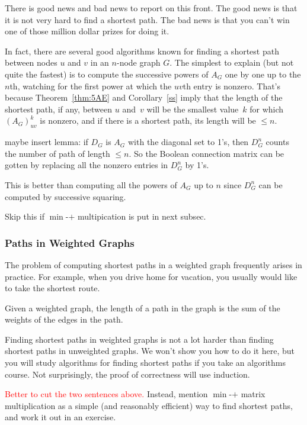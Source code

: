 There is good news and bad news to report on this front.  The good
news is that it is not very hard to find a shortest path.  The bad
news is that you can't win one of those million dollar prizes for
doing it.

In fact, there are several good algorithms known for finding a shortest
path between nodes $u$ and $v$ in an $n$-node graph $G$.  The simplest to
explain (but not quite the fastest) is to compute  the successive powers of $A_G$ one by one up to the
$n$th, watching for the first power at which the $uv$th entry is nonzero.
That's because Theorem~\ref{thm:5AE} and Corollary~\ref{ss} imply that the
length of the shortest path, if any, between $u$ and~$v$ will be the smallest
value~$k$ for which $(A_G)_{uv}^k$  is nonzero, and if there is a shortest
path, its length will be $\leq n$.

\begin{editingnotes}
maybe insert lemma: if $D_G$ is $A_G$ with the diagonal set to 1's, then $D_G^n$
counts the number of path of length $\leq n$.  So the Boolean connection
matrix can be gotten by replacing all the nonzero entries in $D_G^n$ by 1's.

This is better than computing all the powers of $A_G$ up to $n$ since
$D_G^n$ can be computed by successive squaring.

Skip this if $\min$-$+$ multipication is put in next subsec.
\end{editingnotes}

\subsubsection{Paths in Weighted Graphs}

The problem of computing shortest paths in a weighted graph frequently
arises in practice.  For example, when you drive home for vacation, you
usually would like to take the shortest route.

\begin{definition}\label{def:5H}
Given a weighted graph, the length of a path in the graph is the sum
of the weights of the edges in the path.
\end{definition}

Finding shortest paths in weighted graphs is not a lot harder than
finding shortest paths in unweighted graphs.
We won't show you how to do it here, but you will study algorithms for
finding shortest paths if you take an algorithms course.  Not
surprisingly, the proof of correctness will use induction.
\begin{editingnotes}
\textcolor{red}{Better to cut the two sentences above.}  Instead,
 mention $\min$-$+$ matrix multiplication as a
  simple (and reasonably efficient) way to find shortest paths, and work it
  out in an exercise.
\end{editingnotes}

